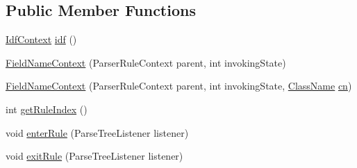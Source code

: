 \subsection*{Public Member Functions}
\begin{DoxyCompactItemize}
\item 
\hyperlink{classgov_1_1nasa_1_1jpf_1_1inspector_1_1server_1_1expression_1_1parser_1_1_expression_grammar_parser_1_1_idf_context}{Idf\+Context} \hyperlink{classgov_1_1nasa_1_1jpf_1_1inspector_1_1server_1_1expression_1_1parser_1_1_expression_grammar_parser_1_1_field_name_context_a688dcfaf1599ca76c1650478c67a5561}{idf} ()
\item 
\hyperlink{classgov_1_1nasa_1_1jpf_1_1inspector_1_1server_1_1expression_1_1parser_1_1_expression_grammar_parser_1_1_field_name_context_a2ade567c63f20fbd835484dcc8bd50be}{Field\+Name\+Context} (Parser\+Rule\+Context parent, int invoking\+State)
\item 
\hyperlink{classgov_1_1nasa_1_1jpf_1_1inspector_1_1server_1_1expression_1_1parser_1_1_expression_grammar_parser_1_1_field_name_context_a1e9406326f46c40a5839838459d0f67e}{Field\+Name\+Context} (Parser\+Rule\+Context parent, int invoking\+State, \hyperlink{classgov_1_1nasa_1_1jpf_1_1inspector_1_1utils_1_1expressions_1_1_class_name}{Class\+Name} \hyperlink{classgov_1_1nasa_1_1jpf_1_1inspector_1_1server_1_1expression_1_1parser_1_1_expression_grammar_parser_1_1_field_name_context_a228decb1dbee418574b6330457fa7d98}{cn})
\item 
int \hyperlink{classgov_1_1nasa_1_1jpf_1_1inspector_1_1server_1_1expression_1_1parser_1_1_expression_grammar_parser_1_1_field_name_context_ab43e91fb4fe73867df472870ca09194a}{get\+Rule\+Index} ()
\item 
void \hyperlink{classgov_1_1nasa_1_1jpf_1_1inspector_1_1server_1_1expression_1_1parser_1_1_expression_grammar_parser_1_1_field_name_context_af62e14e2146f28233e6d537ea4b207ed}{enter\+Rule} (Parse\+Tree\+Listener listener)
\item 
void \hyperlink{classgov_1_1nasa_1_1jpf_1_1inspector_1_1server_1_1expression_1_1parser_1_1_expression_grammar_parser_1_1_field_name_context_ad20daf1bd9123feb6ef97de1e1276c40}{exit\+Rule} (Parse\+Tree\+Listener listener)
\end{DoxyCompactItemize}
